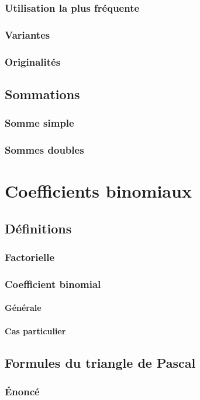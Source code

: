 \documentclass[12pt,a4paper,french]{book}
\begin{document}
		\subsection{Utilisation la plus fréquente}
		\subsection{Variantes}
		\subsection{Originalités}
	\section{Sommations}
		\subsection{Somme simple}
		\subsection{Sommes doubles}
\chapter{Coefficients binomiaux}
	\section{Définitions}
		\subsection{Factorielle}
		\subsection{Coefficient binomial}
			\subsubsection{Générale}
			\subsubsection{Cas particulier}
	\section{Formules du triangle de Pascal}
		\subsection{Énoncé}
\end{document}
